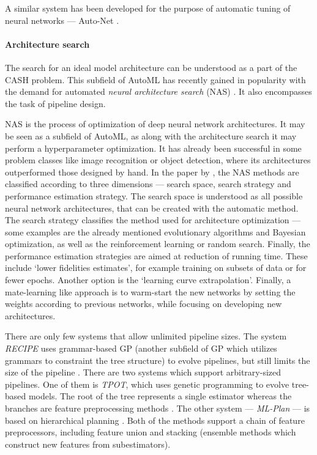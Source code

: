 A similar system has been developed for the purpose of automatic tuning of neural
networks --- Auto-Net \citep{pmlr-v64-mendoza_towards_2016}.

\paragraph{Architecture search}
The search for an ideal model architecture can be understood as a part of the
CASH problem. This subfield of AutoML has recently gained in popularity with the
demand for automated \emph{neural architecture search} (NAS)
\citep{2018arXiv180805377E}. It also encompasses the task of pipeline design.

NAS is the process of optimization of deep neural network architectures. It may be
seen as a subfield of AutoML, as along with the architecture search it may perform
a hyperparameter optimization. It has already been
successful in some problem classes like image recognition or object detection, where
its architectures outperformed those designed by hand. In the paper by 
\cite{2018arXiv180805377E}, the NAS methods are classified according to three
dimensions --- search space, search strategy and performance estimation strategy.
The search space is understood as all possible neural network architectures, that
can be created with the automatic method. The search strategy classifies the method
used for architecture optimization --- some examples are the already mentioned
evolutionary algorithms and Bayesian optimization, as well as the reinforcement
learning or random search. Finally, the performance estimation strategies are aimed
at reduction of running time. These include `lower fidelities estimates', for example
training on subsets of data or for fewer epochs. Another option is the `learning
curve extrapolation'. Finally, a mate-learning like approach is to warm-start the
new networks by setting the weights according to previous networks, while focusing
on developing new architectures.

There are only few systems that allow unlimited pipeline sizes. The system
\emph{RECIPE} uses grammar-based GP (another subfield of GP which utilizes grammars
to constraint the tree structure) to evolve pipelines, but still limits the
size of the pipeline \citep{10.1007/978-3-319-55696-3_16}.
There are two systems which support arbitrary-sized pipelines. One of them is
\emph{TPOT}, which uses genetic programming to evolve tree-based models. The
root of the tree represents a single estimator whereas the branches are feature
preprocessing methods \citep{Olson2016EvoBio}.
The other system --- \emph{ML-Plan} --- is based on hierarchical planning
\citep{Mohr2018}. Both of the methods support a chain of feature preprocessors,
including feature union and stacking (ensemble methods which construct new
features from subestimators).

